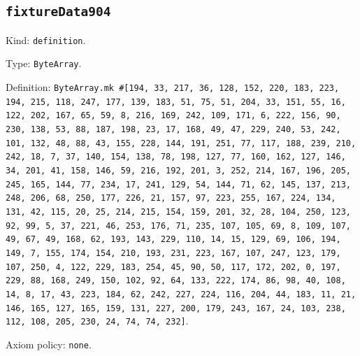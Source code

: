 \documentclass[11pt]{article}
\begin{document}
\subsection*{\texttt{fixtureData904}}
\noindent Kind: \texttt{definition}.\par
\noindent Type: \texttt{ByteArray}.\par
\noindent Definition: \texttt{ByteArray.mk \#[194, 33, 217, 36, 128, 152, 220, 183, 223, 194, 215, 118, 247, 177, 139, 183, 51, 75, 51, 204, 33, 151, 55, 16, 122, 202, 167, 65, 59, 8, 216, 169, 242, 109, 171, 6, 222, 156, 90, 230, 138, 53, 88, 187, 198, 23, 17, 168, 49, 47, 229, 240, 53, 242, 101, 132, 48, 88, 43, 155, 228, 144, 191, 251, 77, 117, 188, 239, 210, 242, 18, 7, 37, 140, 154, 138, 78, 198, 127, 77, 160, 162, 127, 146, 34, 201, 41, 158, 146, 59, 216, 192, 201, 3, 252, 214, 167, 196, 205, 245, 165, 144, 77, 234, 17, 241, 129, 54, 144, 71, 62, 145, 137, 213, 248, 206, 68, 250, 177, 226, 21, 157, 97, 223, 255, 167, 224, 134, 131, 42, 115, 20, 25, 214, 215, 154, 159, 201, 32, 28, 104, 250, 123, 92, 99, 5, 37, 221, 46, 253, 176, 71, 235, 107, 105, 69, 8, 109, 107, 49, 67, 49, 168, 62, 193, 143, 229, 110, 14, 15, 129, 69, 106, 194, 149, 7, 155, 174, 154, 210, 193, 231, 223, 167, 107, 247, 123, 179, 107, 250, 4, 122, 229, 183, 254, 45, 90, 50, 117, 172, 202, 0, 197, 229, 88, 168, 249, 150, 102, 92, 64, 133, 222, 174, 86, 98, 40, 108, 14, 8, 17, 43, 223, 184, 62, 242, 227, 224, 116, 204, 44, 183, 11, 21, 146, 165, 127, 165, 159, 131, 227, 200, 179, 243, 167, 24, 103, 238, 112, 108, 205, 230, 24, 74, 74, 232]}.\par
\noindent Axiom policy: \texttt{none}.\par
\end{document}
